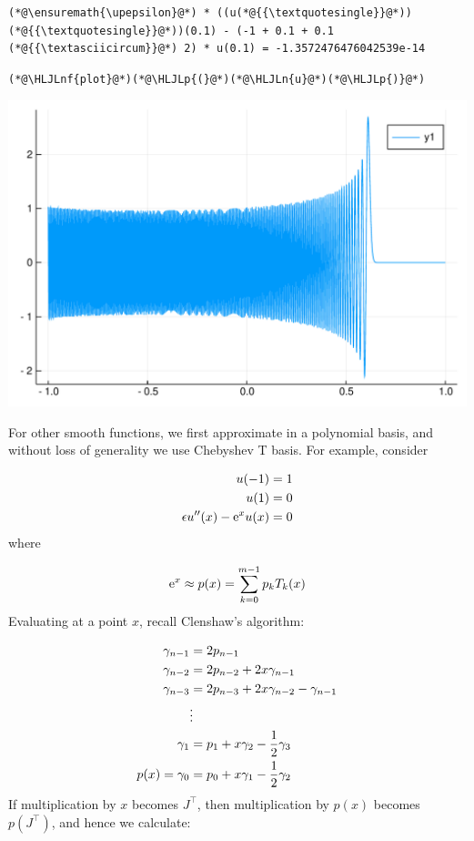 \documentclass[12pt,a4paper]{article}
\newcommand{\HLJLn}[1]{#1}
\newcommand{\HLJLnf}[1]{\textcolor[RGB]{66,102,213}{#1}}
\newcommand{\HLJLp}[1]{#1}
\def\half{ {1 \over 2} }
\def\E{ {\rm e} }
\def\upepsilon{\varepsilon}
\begin{document}
\begin{lstlisting}
(*@\ensuremath{\upepsilon}@*) * ((u(*@{{\textquotesingle}}@*))(*@{{\textquotesingle}}@*))(0.1) - (-1 + 0.1 + 0.1 (*@{{\textasciicircum}}@*) 2) * u(0.1) = -1.3572476476042539e-14
\end{lstlisting}


\begin{lstlisting}
(*@\HLJLnf{plot}@*)(*@\HLJLp{(}@*)(*@\HLJLn{u}@*)(*@\HLJLp{)}@*)
\end{lstlisting}

\includegraphics[width=\linewidth]{figures/Lecture22_19_1.pdf}

For other smooth functions, we first approximate in a polynomial basis,  and without loss of generality we use Chebyshev T basis. For example, consider 


\begin{align*}
u(-1) &= 1\\
u(1) &= 0\\
\epsilon u''(x) - \E^x u(x) &= 0
\end{align*}
where

\[
\E^x  \approx p(x) = \sum_{k=0}^{m-1} p_k T_k(x)
\]
Evaluating at a point $x$, recall Clenshaw's algorithm:


\begin{align*}
\gamma_{n-1} &= 2p_{n-1} \\
\gamma_{n-2} &= 2p_{n-2} + 2x \gamma_{n-1} \\
\gamma_{n-3} &= 2 p_{n-3} + 2x \gamma_{n-2} - \gamma_{n-1} \\
& \vdots \\
\gamma_1 &= p_1 + x \gamma_2 - \half \gamma_3 \\
p(x) = \gamma_0 &= p_0 + x \gamma_1 - \half \gamma_2
\end{align*}
If multiplication by $x$ becomes $J^\top$, then multiplication by $p(x)$ becomes $p(J^\top)$, and hence we calculate:
\end{document}
